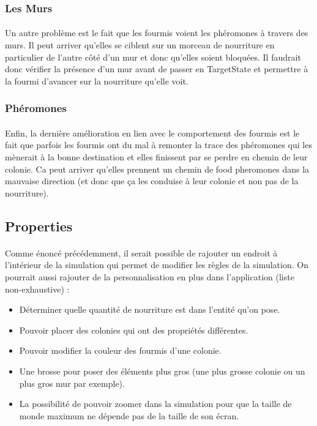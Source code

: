 \documentclass{EPUProjetDi}
\begin{document}
\subsubsection{Les Murs}
\paragraph{}
Un autre problème est le fait que les fourmis voient les phéromones à travers des murs. Il peut arriver qu'elles se ciblent sur un morceau de 
nourriture en particulier de l'autre côté d'un mur et donc qu'elles soient bloquées.
Il faudrait donc vérifier la présence d'un mur avant de passer en TargetState et permettre à la fourmi d'avancer sur la nourriture qu'elle voit.

\subsubsection{Phéromones}
\paragraph{}
Enfin, la dernière amélioration en lien avec le comportement des fourmis est le fait que parfois les fourmis ont du mal à remonter la trace des phéromones qui les mènerait à la bonne destination et elles finissent par
se perdre en chemin de leur colonie. Ca peut arriver qu'elles prennent un chemin de food pheromones dans la mauvaise direction (et donc que ça les conduise à leur colonie et non pas de la nourriture).

\subsection{Properties}
\paragraph{}
Comme énoncé précédemment, il serait possible de rajouter un endroit à l'intérieur de la simulation qui permet de modifier les règles de la simulation.
On pourrait aussi rajouter de la personnalisation en plus dans l'application (liste non-exhaustive) : 
\begin{itemize}
    \item Déterminer quelle quantité de nourriture est dans l'entité qu'on pose.
    \item Pouvoir placer des colonies qui ont des propriétés différentes.
    \item Pouvoir modifier la couleur des fourmis d'une colonie.
    \item Une brosse pour poser des éléments plus gros (une plus grosse colonie ou un plus gros mur par exemple).
    \item La possibilité de pouvoir zoomer dans la simulation pour que la taille de monde maximum ne dépende pas de la taille de son écran.
\end{itemize}
\end{document}
